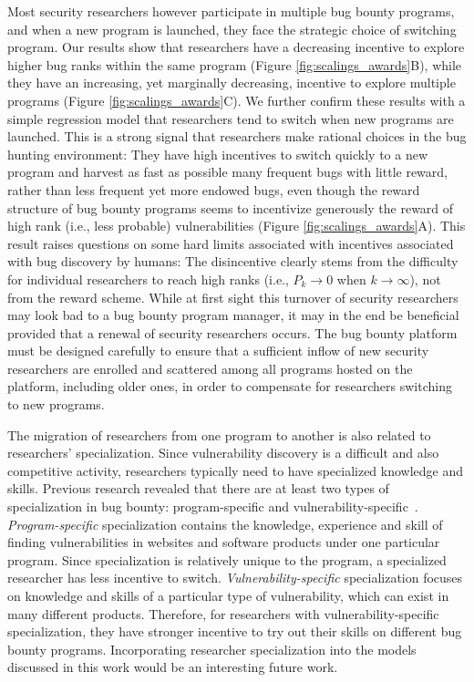 Most security researchers however participate in multiple bug bounty programs, and when a new program is launched, they face the strategic choice of switching program. Our results show that researchers have a decreasing incentive to explore higher bug ranks within the same program (Figure \ref{fig:scalings_awards}B), while they have an increasing, yet marginally decreasing, incentive to explore multiple programs (Figure \ref{fig:scalings_awards}C). We further confirm these results with a simple regression model that researchers tend to switch when new programs are launched. This is a strong signal that researchers make rational choices in the bug hunting environment: They have high incentives to switch quickly to a new program and harvest as fast as possible many frequent bugs with little reward, rather than less frequent yet more endowed bugs, even though the reward structure of bug bounty programs seems to incentivize generously the reward of high rank (i.e., less probable) vulnerabilities (Figure \ref{fig:scalings_awards}A). This result raises questions on some hard limits associated with incentives associated with bug discovery by humans: The disincentive clearly stems from the difficulty for individual researchers to reach high ranks (i.e., $P_{k} \rightarrow 0$ when $k \rightarrow \infty$), not from the reward scheme. While at first sight this turnover of security researchers may look bad to a bug bounty program manager, it may in the end be beneficial provided that a renewal of security researchers occurs. The bug bounty platform must be designed carefully to ensure that a sufficient inflow of new security researchers are enrolled and scattered among all programs hosted on the platform, including older ones, in order to compensate for researchers switching to new programs.\\

\begin{revision}
The migration of researchers from one program to another is also related to researchers' specialization. Since vulnerability discovery is a difficult and also competitive activity, researchers typically need to have specialized knowledge and skills. Previous research revealed that there are at least two types of specialization in bug bounty: program-specific and vulnerability-specific~\cite{zhao2014exploratory,zhao2015empirical}. \textit{Program-specific} specialization contains the knowledge, experience and skill of finding vulnerabilities in websites and software products under one particular program. Since specialization is relatively unique to the program, a specialized researcher has less incentive to switch. \textit{Vulnerability-specific} specialization focuses on knowledge and skills of a particular type of vulnerability, which can exist in many different products. Therefore, for researchers with vulnerability-specific specialization, they have stronger incentive to try out their skills on different bug bounty programs. Incorporating researcher specialization into the models discussed in this work would be an interesting future work. \\
\end{revision}

